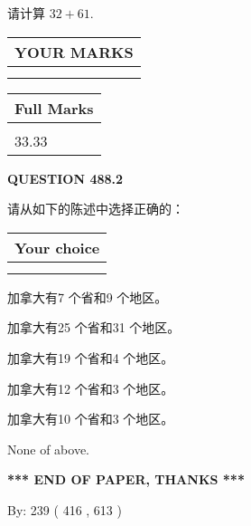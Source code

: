 \documentclass{ctexart}
\begin{document}
  
 
请计算 $ %
32 +  %
61 $.
 

 

 
  
\vspace{0.2in}
  
\noindent\begin{tabular}{|l|}
\hline
 YOUR MARKS  \\
\hline
 \\ 
 \\ 
\hline
\end{tabular}
\hspace{0.05in} \begin{tabular}{|l|}
\hline
 Full Marks  \\
\hline
 \\ 
33.33 \\
\hline
\end{tabular}
{\textbf{\Large{QUESTION
488.2 
}}}
  
  
请从如下的陈述中选择正确的：
  
  
\noindent\hspace{3.0in} \begin{tabular}{|l|}
\hline
Your choice \\
\hline
 \\ 
 \\ 
\hline
\end{tabular}
  
  
 
 
加拿大有7 个省和9 个地区。
 
 
加拿大有25 个省和31 个地区。
 
 
加拿大有19 个省和4 个地区。
 
 
加拿大有12 个省和3 个地区。
 
 
加拿大有10 个省和3 个地区。
 
 
 None of above.
 
 
   
   
 \vspace{0.2in}
 
   
   
   
   
\vspace{1.0in} 
{\textbf{\large{ *** END OF PAPER, THANKS *** }}} 
   
   
\hspace{1.0in} By: 
 239 ( 416 ,  613 )
   
\end{document}
